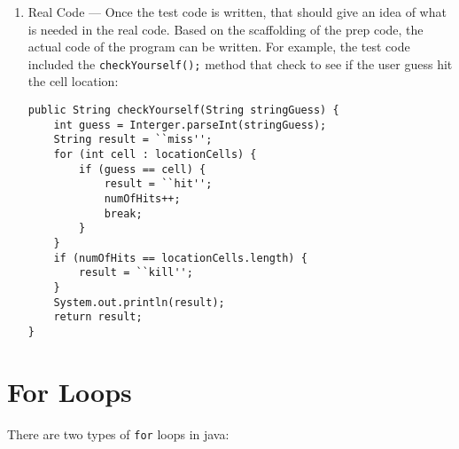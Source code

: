 \documentclass{tufte-handout}
\begin{document}
\begin{enumerate}
        \item Real Code --- Once the test code is written, that should give an idea of what is needed in the real code. Based on the scaffolding of the prep code, the actual code of the program can be written. For example, the test code included the \texttt{checkYourself();} method that check to see if the user guess hit the cell location:
        \begin{lstlisting}
public String checkYourself(String stringGuess) {
    int guess = Interger.parseInt(stringGuess);
    String result = ``miss'';
    for (int cell : locationCells) {
        if (guess == cell) {
            result = ``hit'';
            numOfHits++;
            break;
        }
    }
    if (numOfHits == locationCells.length) {
        result = ``kill'';
    }
    System.out.println(result);
    return result;
}
        \end{lstlisting}
    \end{enumerate}

    \section*{For Loops}
    There are two types of \texttt{for} loops in java:
\end{document}
